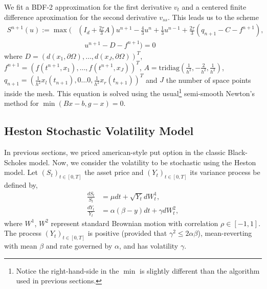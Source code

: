 \documentclass[12pt,a4paper]{article}
\begin{document}
We fit a BDF-2 approximation for the first derivative $v_t$ and a centered finite difference aproximation for the second derivative $v_{ss}$. This leads us to the scheme
\begin{align*}
	S^{n+1}(u) := \max \bigg( &(I_d +\frac{2\tau}{3} A) u^{n+1} - \frac{4}{3} u^n + \frac{1}{3} u^{n-1} + \frac{2\tau}{3} (q_{n+1} - C - f^{n+1}), \\
	& \quad u^{n+1} - D - f^{n+1} \bigg) = 0
\end{align*} 
where $D = (d(x_1, \partial \Omega), \dots, d(x_J, \partial \Omega))^T$, $f^{n+1} = (f(t^{n+1},x_1), \dots, f(t^{n+1},x_J))^T$, $A = \text{tridiag} \left( \frac{1}{h^2},-\frac{2}{h^2},\frac{1}{h^2} \right)$, $q_{n+1} = \left( \frac{1}{h^2} x_l(t_{n+1}), 0 \dots 0, \frac{1}{h^2} x_r(t_{n+1}) \right)^T$ and $J$ the number of space points inside the mesh. This equation is solved using the usual\footnote{Notice the right-hand-side in the $\min$ is slightly different than the algorithm used in previous sections.} semi-smooth Newton's method for $\min(Bx - b, g - x) = 0$.

		\subsection{Heston Stochastic Volatility Model}

	In previous sections, we priced american-style put option in the classic Black-Scholes model. Now, we consider the volatility to be stochastic using the Heston model. Let $(S_t)_{t \in [0,T]}$ the asset price and $(Y_t)_{t \in [0,T]}$ its variance process be defined by,
\begin{align}
	\frac{dS_t}{S_t} &= \mu dt + \sqrt{Y_t} dW^1_t, \\
	\frac{dY_t}{Y_t} &= \alpha (\beta - y) dt + \gamma dW^2_t,
\end{align}
where $W^1$, $W^2$ represent standard Brownian motion with correlation $\rho \in [-1, 1]$. The process $(Y_t)_{t \in [0,T]}$ is positive (provided that $\gamma^2 \leq 2 \alpha \beta$), mean-reverting with mean $\beta$ and rate governed by $\alpha$, and has volatility $\gamma$. 
\end{document}
